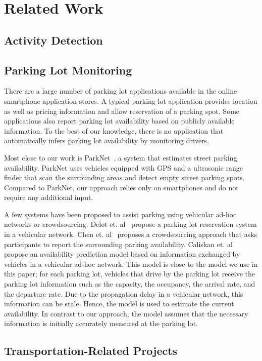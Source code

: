 \section{Related Work}
\label{sec-related}

\subsection{Activity Detection}

\subsection{Parking Lot Monitoring}

There are a large number of parking lot applications available in the online
smartphone application stores. A typical parking lot application provides
location as well as pricing information and allow reservation of a parking spot.
Some applications also report parking lot availability based on publicly
available information. To the best of our knowledge, there is no application
that automatically infers parking lot availability by monitoring drivers.

Most close to our work is ParkNet~\cite{Mathur:2010:PDS}, a system that
estimates street parking availability. ParkNet uses vehicles equipped with GPS
and a ultrasonic range finder that scan the surrounding areas and detect
empty street parking spots. Compared to ParkNet, our approach relies only on
smartphones and do not require any additional input.

A few systems have been proposed to assist parking using vehicular ad-hoc
networks or crowdsourcing. Delot et. al~\cite{Delot:2009:CRP} propose a parking
lot reservation system in a vehicular network. Chen et. al~\cite{Chen:2012:COS}
proposes a crowdsourcing approach that asks participants to report the
surrounding parking availability. Caliskan et. al~\cite{4212497} propose an
availability prediction model based on information exchanged by vehicles in a
vehicular ad-hoc network. This model is close to the model we use in this
paper; for each parking lot, vehicles that drive by the parking lot receive the
parking lot information such as the capacity, the occupancy, the arrival rate,
and the departure rate. Due to the propagation delay in a vehicular network,
this information can be stale. Hence, the model is used to estimate the current
availability. In contrast to our approach, the model assumes that the necessary
information is initially accurately measured at the parking lot.

\subsection{Transportation-Related Projects}
